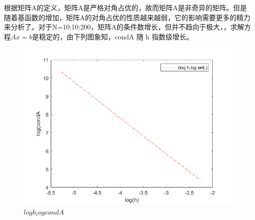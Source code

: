 \documentclass{article}
\begin{document}
根据矩阵A的定义，矩阵A是严格对角占优的，故而矩阵A是非奇异的矩阵。但是随着基函数的增加，矩阵A的对角占优的性质越来越弱，它的影响需要更多的精力来分析了。对于N=10:10:200，矩阵A的条件数增长，但并不趋向于极大，，求解方程$Ax=b$是稳定的，由下列图象知，condA 随 h 指数级增长。

\begin{figure}[H]
	\centering
	\includegraphics[scale=0.5]{logh_logcondA.png}
	\caption{\label{logh_logcondA}$logh_logcondA$}
\end{figure}
\end{document}

